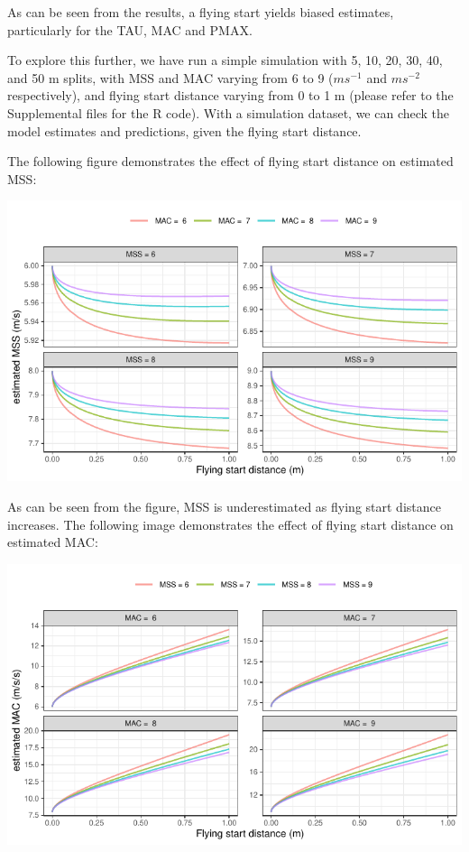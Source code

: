 \documentclass[fleqn,10pt,lineno]{wlpeerj} %
\begin{document}
As can be seen from the results, a flying start yields biased estimates, particularly for the TAU, MAC and PMAX.

To explore this further, we have run a simple simulation with 5, 10, 20, 30, 40, and 50 m splits, with MSS and MAC varying from 6 to 9 (\(ms^{-1}\) and \(ms^{-2}\) respectively), and flying start distance varying from 0 to 1 m (please refer to the Supplemental files for the R code). With a simulation dataset, we can check the model estimates and predictions, given the flying start distance.

The following figure demonstrates the effect of flying start distance on estimated MSS:

\begin{center}\includegraphics[width=0.9\linewidth]{paper_files/figure-latex/unnamed-chunk-29-1} \end{center}

As can be seen from the figure, MSS is underestimated as flying start distance increases. The following image demonstrates the effect of flying start distance on estimated MAC:

\begin{center}\includegraphics[width=0.9\linewidth]{paper_files/figure-latex/unnamed-chunk-30-1} \end{center}
\end{document}
